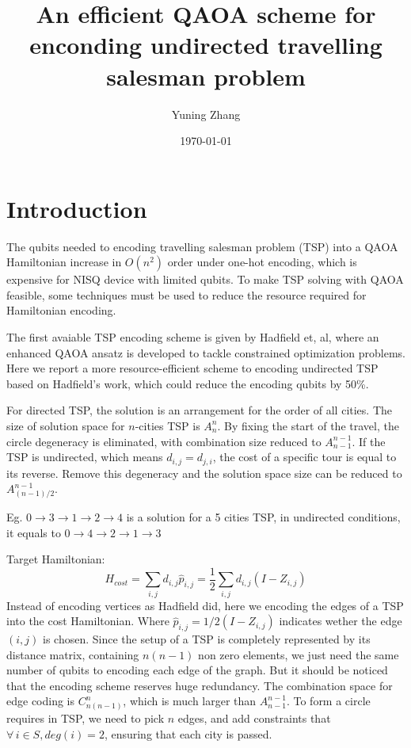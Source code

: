 \documentclass[%
aps, %
prl, %
preprint, %
12pt, %
amsfonts, %
amssymb, %
amsmath, %
endfloats,%
notitlepage, %
raggedbottom, %
]{revtex4-1}
\begin{document}
\preprint{}

\title{An efficient QAOA scheme for enconding undirected travelling salesman problem}
\author{Yuning Zhang}


\date{\today}
\maketitle

\section{\label{sec:Intro}Introduction}
The qubits needed to encoding travelling salesman problem (TSP) into a QAOA Hamiltonian increase in $O(n^2)$ order under one-hot encoding, which is expensive for NISQ device with limited qubits. To make TSP solving with QAOA feasible, some techniques must be used to reduce the resource required for Hamiltonian encoding.

The first avaiable TSP encoding scheme is given by Hadfield et, al, where an enhanced QAOA ansatz is developed to tackle constrained optimization problems. Here we report a more resource-efficient scheme to encoding undirected TSP based on Hadfield's work, which could reduce the encoding qubits by 50\%.

For directed TSP, the solution is an arrangement for the order of all cities. The size of solution space for $n$-cities TSP is $A_n^n$. By fixing the start of the travel, the circle degeneracy is eliminated, with combination size reduced to $A_{n-1}^{n-1}$. If the TSP is undirected, which means $d_{i,j}=d_{j,i}$, the cost of a specific tour is equal to its reverse. Remove this degeneracy and the solution space size can be reduced to $A_{(n-1)/2}^{n-1}$.

Eg.
$0\rightarrow3\rightarrow1\rightarrow2\rightarrow4$ is a solution for a 5 cities TSP,
in undirected conditions, it equals to 
$0\rightarrow4\rightarrow2\rightarrow1\rightarrow3$


Target Hamiltonian:
$$
H_{cost}=\sum_{i,j} d_{i,j} \hat p_{i,j}=\frac{1}{2}\sum_{i,j} d_{i,j} (I-Z_{i,j})
$$
Instead of encoding vertices as Hadfield did, here we encoding the edges of a TSP into the cost Hamiltonian. Where $\hat p_{i,j}=1/2(I-Z_{i,j})$ indicates wether the edge $(i,j)$ is chosen. Since the setup of a TSP is completely represented by its distance matrix, containing $n(n-1)$ non zero elements, we just need the same number of qubits to encoding each edge of the graph. But it should be noticed that the encoding scheme reserves huge redundancy. The combination space for edge coding is $C_{n(n-1)}^n$, which is much larger than $A_{n-1}^{n-1}$. To form a circle requires in TSP, we need to pick $n$ edges, and add constraints that $\forall\, i\in S, deg(i)=2$, ensuring that each city is passed. 
\end{document}
